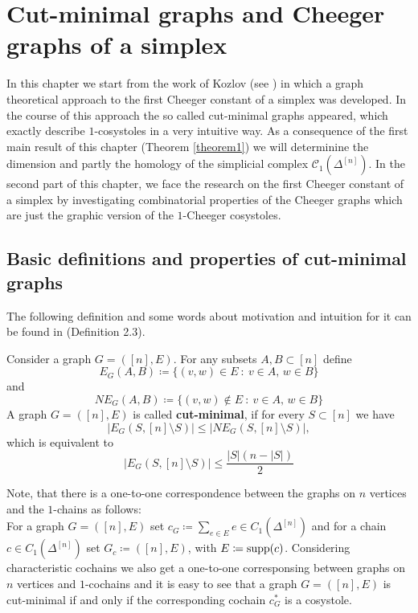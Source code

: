 
\chapter{Cut-minimal graphs and Cheeger graphs of a simplex}

\label{Chapter3}

In this chapter we start from the work of Kozlov (see \cite{1}) in which a graph theoretical approach to the first Cheeger constant of a simplex was developed. In the course of this approach the so called cut-minimal graphs appeared, which exactly describe \(1\)-cosystoles in a very intuitive way. As a consequence of the first main result of this chapter (Theorem \ref{theorem1}) we will determinine the dimension and partly the homology of the simplicial complex \(\mathcal{C}_1(\Delta^{[n]})\). In the second part of this chapter, we face the research on the first Cheeger constant of a simplex by investigating combinatorial properties of the Cheeger graphs which are just the graphic version of the \(1\)-Cheeger cosystoles.

\section{Basic definitions and properties of cut-minimal graphs}
The following definition and some words about motivation and intuition for it can be found in \cite{1} (Definition 2.3).

\begin{defi}
Consider a graph \(G=([n],E)\). For any subsets \(A,B\subset [n]\) define
\[
E_G(A,B)\coloneqq \{(v,w)\in E\: :\: v\in A\text{, }w\in B\}
\]
and
\[
NE_G(A,B)\coloneqq \{(v,w)\notin E\: :\: v\in A\text{, }w\in B\}
\]
A graph \(G=([n],E)\) is called \textbf{cut-minimal}, if for every \(S\subset[n]\) we have
\[
|E_G(S,[n]\setminus S)|\leq |NE_G(S,[n]\setminus S)|,
\]
which is equivalent to
\[
|E_G(S,[n]\setminus S)|\leq\frac{|S|(n-|S|)}{2}
\]
\end{defi}

Note, that there is a one-to-one correspondence between the graphs on \(n\) vertices and the \(1\)-chains  as follows:\\
For a graph \(G=([n],E)\) set \(c_G\coloneqq \sum\limits_{e\in E}e\in C_1(\Delta^{[n]})\) and for a chain \(c\in C_1(\Delta^{[n]})\) set \(G_c\coloneqq ([n],E)\), with \(E\coloneqq \mathrm{supp}(c)\). Considering characteristic cochains we also get a one-to-one corresponsing between graphs on \(n\) vertices and \(1\)-cochains and it is easy to see that a graph \(G=([n],E)\) is cut-minimal if and only if the corresponding cochain \(c_G^*\) is a cosystole.

